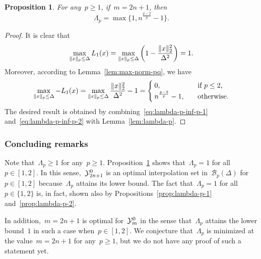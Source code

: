 \documentclass{article}
\numberwithin{equation}{section}
\theoremstyle{definition}
\theoremstyle{plain}
\newtheorem{proposition}{Proposition}[section]
\theoremstyle{remark}
\newcommand*{\lagp}[1][]{L\ifblank{#1}{}{_{#1}}}
\newcommand*{\norm}[2][]{#1\lVert#2#1\rVert}
\newcommand*{\set}[2][]{#1\{#2#1\}}
\newcommand*{\xpt}[1][]{\mathcal{Y}\ifblank{#1}{}{^{#1}}}
\begin{document}
\begin{proposition}
    \label{prop:lambda-p-opt}
    For any~$p \ge 1$, if~$m = 2n + 1$, then
    \begin{equation*}
        \Lambda_p = \max \set[\big]{1, n^{\frac{p - 2}{p}} - 1}.
    \end{equation*}
\end{proposition}

\begin{proof}
    It is clear that
    \begin{equation}
        \label{eq:lambda-p-inf-p-1}
        \max_{\norm{x}_p \le \Delta} \lagp[1](x) = \max_{\norm{x}_p \le \Delta} \bigg( 1 - \frac{\norm{x}_2^2}{\Delta^2} \bigg) = 1.
    \end{equation}
    Moreover, according to Lemma~\ref{lem:max-norm-pq}, we have
    \begin{equation}
        \label{eq:lambda-p-inf-p-2}
        \max_{\norm{x}_p \le \Delta} -\lagp[1](x) = \max_{\norm{x}_p \le \Delta} \frac{\norm{x}_2^2}{\Delta^2} - 1 =
        \begin{cases}
            0,                          & \quad \text{if~$p \le 2$,}\\
            n^{\frac{p - 2}{p}} - 1,    & \quad \text{otherwise.}
        \end{cases}
    \end{equation}
    The desired result is obtained by combining~\eqref{eq:lambda-p-inf-p-1} and~\eqref{eq:lambda-p-inf-p-2} with Lemma~\ref{lem:lambda-p}.
\end{proof}

\subsubsection{Concluding remarks}

Note that~$\Lambda_p \ge 1$ for any~$p \ge 1$.
Proposition~\ref{prop:lambda-p-opt} shows that~$\Lambda_p = 1$ for all~$p \in [1, 2]$.
In this sense,~$\xpt[0]_{2n + 1}$ is an optimal interpolation set in~$\mathcal{B}_p(\Delta)$ for~$p \in [1, 2]$ because~$\Lambda_p$ attains its lower bound.
The fact that~$\Lambda_p = 1$ for all~$p \in \set{1, 2}$ is, in fact, shown also by Propositions~\ref{prop:lambda-p-1} and~\ref{prop:lambda-p-2}.

In addition,~$m = 2n + 1$ is optimal for~$\xpt[0]_m$ in the sense that~$\Lambda_p$ attains the lower bound~$1$ in such a case when~$p \in [1, 2]$.
We conjecture that~$\Lambda_p$ is minimized at the value~$m = 2n + 1$ for any~$p \ge 1$, but we do not have any proof of such a statement yet.
\end{document}
